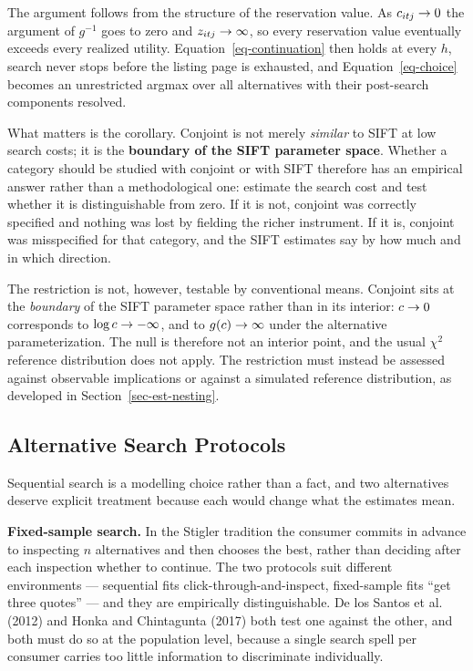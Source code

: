 \documentclass[
  letterpaper,
  DIV=11,
  numbers=noendperiod]{scrartcl}
\begin{document}
The argument follows from the structure of the reservation value. As
\(c_{itj} \to 0\) the argument of \(g^{-1}\) goes to zero and
\(z_{itj} \to \infty\), so every reservation value eventually
exceeds every realized utility. Equation~\ref{eq-continuation} then
holds at every \(h\), search never stops before the listing page is
exhausted, and Equation~\ref{eq-choice} becomes an unrestricted argmax
over all alternatives with their post-search components resolved.

What matters is the corollary. Conjoint is not merely \emph{similar} to
SIFT at low search costs; it is the \textbf{boundary of the SIFT
parameter space}. Whether a category should be studied with conjoint or
with SIFT therefore has an empirical answer rather than a methodological
one: estimate the search cost and test whether it is distinguishable
from zero. If it is not, conjoint was correctly specified and nothing
was lost by fielding the richer instrument. If it is, conjoint was
misspecified for that category, and the SIFT estimates say by how much
and in which direction.

The restriction is not, however, testable by conventional means.
Conjoint sits at the \emph{boundary} of the SIFT parameter space rather
than in its interior: \(c \to 0\) corresponds to
\(\log c \to -\infty\), and to \(g(c) \to \infty\) under the
alternative parameterization. The null is therefore not an interior
point, and the usual \(\chi^2\) reference distribution does not apply.
The restriction must instead be assessed against observable implications
or against a simulated reference distribution, as developed in
Section~\ref{sec-est-nesting}.

\subsection{Alternative Search Protocols}\label{sec-model-alternatives}

Sequential search is a modelling choice rather than a fact, and two
alternatives deserve explicit treatment because each would change what
the estimates mean.

\textbf{Fixed-sample search.} In the Stigler tradition the consumer
commits in advance to inspecting \(n\) alternatives and then chooses the
best, rather than deciding after each inspection whether to continue.
The two protocols suit different environments --- sequential fits
click-through-and-inspect, fixed-sample fits ``get three quotes'' ---
and they are empirically distinguishable. De los Santos et al. (2012)
and Honka and Chintagunta (2017) both test one against the other, and
both must do so at the population level, because a single search spell
per consumer carries too little information to discriminate
individually.
\end{document}

